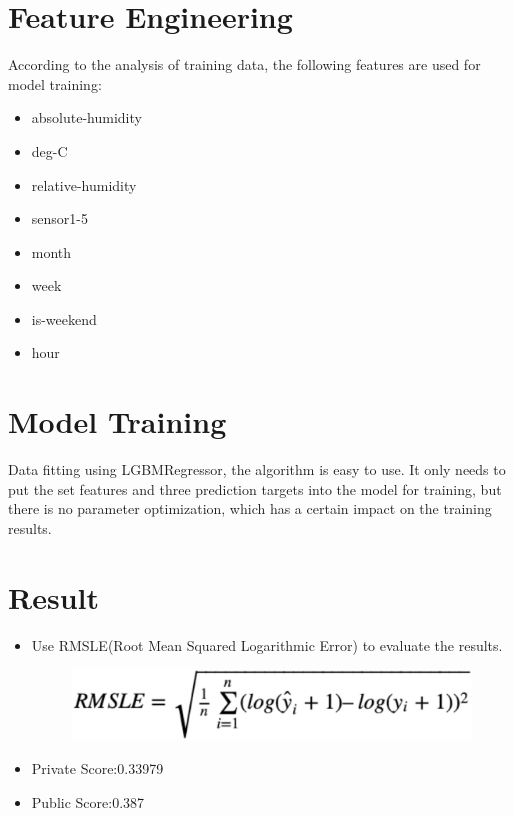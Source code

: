 \section{Feature Engineering} \label{sec-method}
According to the analysis of training data, the following features are used for model training:
\begin{itemize}
	\item absolute-humidity
	\item deg-C
	\item relative-humidity
	\item sensor1-5
	\item month
	\item week
	\item is-weekend
	\item hour
\end{itemize}


\section{Model Training} \label{sec-experiment}
Data fitting using LGBMRegressor, the algorithm is easy to use. 
It only needs to put the set features and three prediction targets into the model for training, 
but there is no parameter optimization, which has a certain impact on the training results.



\section{Result} \label{sec-conclusions}
\begin{itemize}
	\item
	\smallskip
	Use RMSLE(Root Mean Squared Logarithmic Error) to evaluate the results.
	\begin{figure}[H]
		\centering
		\includegraphics[scale=0.3]{figures//RMSLE.eps}\\
	\end{figure}
	
	
	\item
	\smallskip
	Private Score:0.33979
	
	\item
	\smallskip
	Public Score:0.387
	
\end{itemize}


